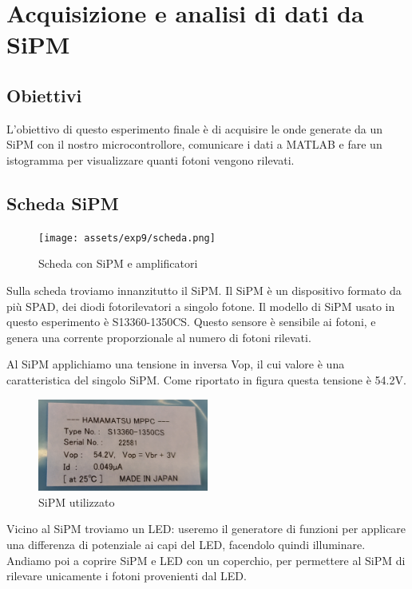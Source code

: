\chapter{Acquisizione e analisi di dati da SiPM}

\section*{Obiettivi}
L'obiettivo di questo esperimento finale è di acquisire le onde generate da un SiPM con il nostro microcontrollore, comunicare i dati a MATLAB e fare un istogramma per visualizzare quanti fotoni vengono rilevati.

\section*{Scheda SiPM}

\begin{figure}[H]
\centering
\texttt{[image: assets/exp9/scheda.png]}
\caption{Scheda con SiPM e amplificatori}
\end{figure}

Sulla scheda troviamo innanzitutto il SiPM. Il SiPM è un dispositivo formato da più SPAD, dei diodi fotorilevatori a singolo fotone. Il modello di SiPM usato in questo esperimento è S13360-1350CS.
Questo sensore è sensibile ai fotoni, e genera una corrente proporzionale al numero di fotoni rilevati.


Al SiPM applichiamo una tensione in inversa Vop, il cui valore è una caratteristica del singolo SiPM. Come riportato in figura questa tensione è 54.2V.

\begin{figure}[H]
\centering
\includegraphics[width=0.5\textwidth]{assets/exp9/SiPM.png}
\caption{SiPM utilizzato}
\end{figure}

Vicino al SiPM troviamo un LED: useremo il generatore di funzioni per applicare una differenza di potenziale ai capi del LED, facendolo quindi illuminare.
Andiamo poi a coprire SiPM e LED con un coperchio, per permettere al SiPM di rilevare unicamente i fotoni provenienti dal LED.

